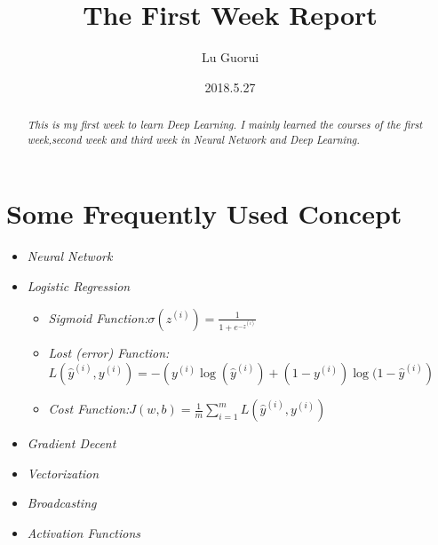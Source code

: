 \documentclass{article}
\title{The First Week Report}
\author{Lu Guorui}
\date{2018.5.27}
\begin{document}
\maketitle
\tableofcontents
\newpage

\begin{abstract}
\textit{This is my first week to learn Deep Learning. I mainly learned the courses of the first week,second week and third week in Neural Network and Deep Learning.}
\end{abstract}

\section{Some Frequently Used Concept}
{
\tiny 
\begin{itemize}

\item \textit{Neural Network}
\item \textit{Logistic Regression}

\begin{itemize}

\item \textit{Sigmoid Function:$\sigma(z^{(i)})= \frac{1}{ 1+e^{-z^{(i)}}}$}
\item \textit{Lost (error) Function:$L(\hat{y}^{(i)},y^{(i)})=-(y^{(i)}\log{(\hat{y}^{(i)})}+(1-y^{(i)})\log{(1-\hat{y}^{(i)}})$}
\item \textit{Cost Function:$J(w,b)=\frac{1}{m}\sum\limits_{i=1}^mL(\hat{y}^{(i)},y^{(i)})$}
\end{itemize}

\item \textit{Gradient Decent}
\item \textit{Vectorization}
\item \textit{Broadcasting}
\item \textit{Activation Functions}
\end{itemize}
}
\end{document}

